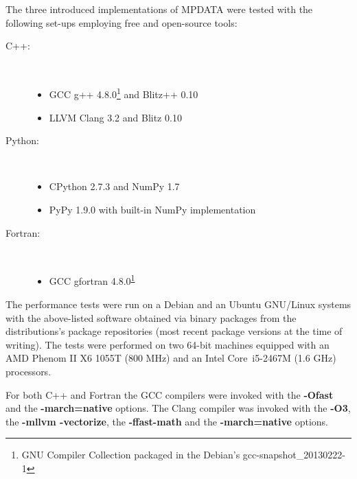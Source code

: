 \documentclass[final,5p,times,twocolumn]{elsarticle}
\newcommand{\prog}[1]{{\rm\bf#1}}
\begin{document}
  The three introduced implementations of MPDATA were tested with the following set-ups 
    employing free and open-source tools:
  \begin{description}
    \item[C++:]{~
      \begin{itemize}
        \item{GCC g++ 4.8.0\footnote{\label{fnt:gcc-snapshot}GNU Compiler Collection packaged in the Debian's gcc-snapshot\_20130222-1}
          and Blitz++ 0.10}
        \item{LLVM Clang 3.2 and Blitz 0.10}
      \end{itemize}
    }
    \item[Python:]{~
      \begin{itemize}
        \item{CPython 2.7.3 and NumPy 1.7}
        \item{PyPy 1.9.0 with built-in NumPy implementation}
      \end{itemize}
    }
    \item[Fortran:]{~
      \begin{itemize}
        \item{GCC gfortran 4.8.0\textsuperscript{\ref{fnt:gcc-snapshot}}}
      \end{itemize}
    }
  \end{description}
  The performance tests were run on a Debian and an Ubuntu GNU/Linux systems with the above-listed software obtained 
    via binary packages from the distributions's package repositories (most recent package versions at the time of writing).
  The tests were performed on two 64-bit machines equipped with
    an AMD Phenom\textsuperscript{\texttrademark} II X6 1055T (800 MHz)
    and an Intel\textsuperscript{\textregistered} Core\textsuperscript{\texttrademark}~i5-2467M (1.6 GHz)
    processors.

  For both C++ and Fortran the GCC compilers were invoked with the \prog{-Ofast} and the 
    \prog{-march=native} options.
  The Clang compiler was invoked with the \prog{-O3}, the \prog{-mllvm -vectorize}, the \prog{-ffast-math} 
    and the \prog{-march=native} options.
\end{document}
